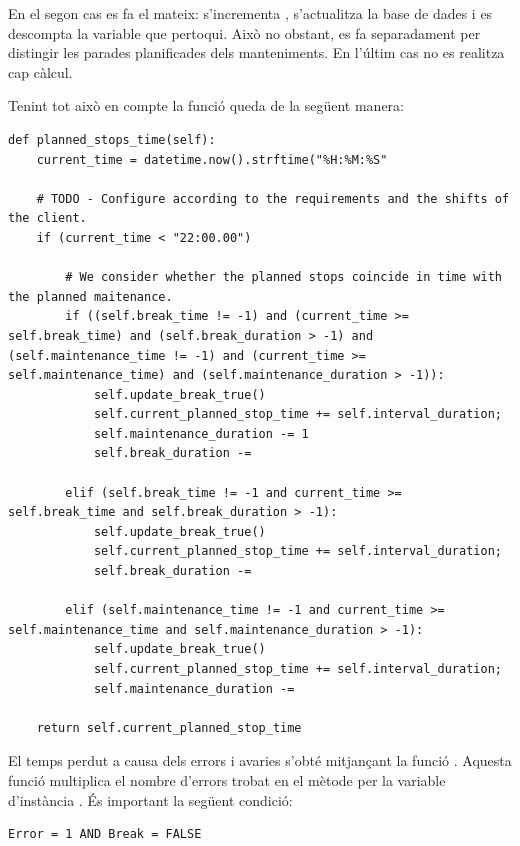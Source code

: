 \documentclass{tfgitic}[2022/06/30]
\begin{document}
En el segon cas es fa el mateix: s'incrementa , s'actualitza la base de dades i es descompta la variable que pertoqui. Això no obstant, es fa separadament per distingir les parades planificades dels manteniments. En l'últim cas no es realitza cap càlcul.

Tenint tot això en compte la funció queda de la següent manera:

\begin{lstlisting}[style = Python]
def planned_stops_time(self):
    current_time = datetime.now().strftime("%H:%M:%S"   
    
    # TODO - Configure according to the requirements and the shifts of the client.
    if (current_time < "22:00.00")  
    
        # We consider whether the planned stops coincide in time with the planned maitenance.
        if ((self.break_time != -1) and (current_time >= self.break_time) and (self.break_duration > -1) and (self.maintenance_time != -1) and (current_time >= self.maintenance_time) and (self.maintenance_duration > -1)):
            self.update_break_true()
            self.current_planned_stop_time += self.interval_duration;
            self.maintenance_duration -= 1
            self.break_duration -=  
            
        elif (self.break_time != -1 and current_time >= self.break_time and self.break_duration > -1):
            self.update_break_true()
            self.current_planned_stop_time += self.interval_duration;
            self.break_duration -=  
            
        elif (self.maintenance_time != -1 and current_time >= self.maintenance_time and self.maintenance_duration > -1):
            self.update_break_true()
            self.current_planned_stop_time += self.interval_duration;
            self.maintenance_duration -=    
            
    return self.current_planned_stop_time
\end{lstlisting}

El temps perdut a causa dels errors i avaries s'obté mitjançant la funció . Aquesta funció multiplica el nombre d'errors trobat en el mètode  per la variable d'instància . És important la següent condició:

\begin{lstlisting}[style = sql]
Error = 1 AND Break = FALSE 
\end{lstlisting}
\end{document}
